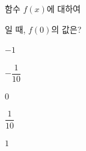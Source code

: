 \hspace*{2mm}\begin{minipage}[t]{\dimexpr\linewidth-2mm\relax}\vspace{0pt}
함수 $f(x)$에 대하여 \par\smallskip{}\par\smallskip\noindent 일 때, $f(0)$의 값은?
\begin{choices32}{\rule[-3ex]{0pt}{8ex}$-1$}{\rule[-3ex]{0pt}{8ex}$-\dfrac{1}{10}$}{\rule[-3ex]{0pt}{8ex}$0$}{\rule[-3ex]{0pt}{8ex}$\dfrac{1}{10}$}{\rule[-3ex]{0pt}{8ex}$1$}\end{choices32}\end{minipage}
